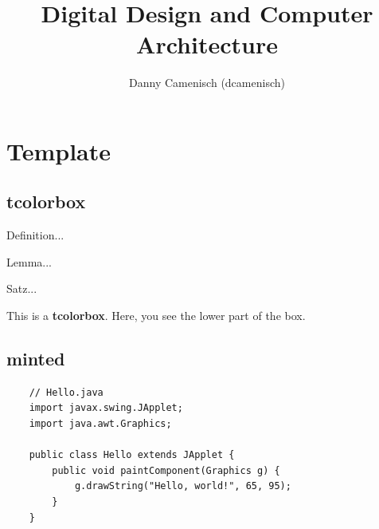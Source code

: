 \documentclass[a4paper]{report}
\title{Digital Design and Computer Architecture}
\author{Danny Camenisch (dcamenisch)}
\begin{document}
\maketitle
\tableofcontents



\chapter{Template}
\section{tcolorbox}

\begin{definition}
    Definition...
\end{definition}

\begin{lemma}
    Lemma...
\end{lemma}

\begin{satz}
    Satz...
\end{satz}

\begin{tcolorbox}[colback=dcWhite,colframe=dcOrange,title=\textbf{My Heading}]
    This is a \textbf{tcolorbox}.
\tcblower
    Here, you see the lower part of the box.
\end{tcolorbox}

\section{minted}

\begin{verbatim}
    // Hello.java
    import javax.swing.JApplet;
    import java.awt.Graphics;
    
    public class Hello extends JApplet {
        public void paintComponent(Graphics g) {
            g.drawString("Hello, world!", 65, 95);
        }    
    }
\end{verbatim}



%
\end{document}

